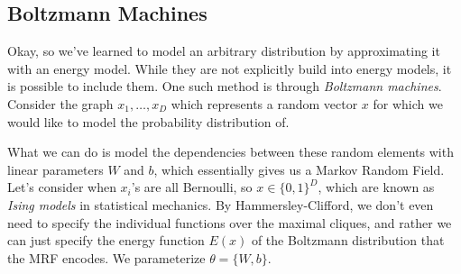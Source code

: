 \subsection{Boltzmann Machines}  

  Okay, so we've learned to model an arbitrary distribution by approximating it with an energy model. While they are not explicitly build into energy models, it is possible to include them. One such method is through \textit{Boltzmann machines}. Consider the graph $x_1, \ldots, x_D$ which represents a random vector $x$ for which we would like to model the probability distribution of. 
  \begin{center}
  \end{center}
  What we can do is model the dependencies between these random elements with linear parameters $W$ and $b$, which essentially gives us a Markov Random Field. Let's consider when $x_i$'s are all Bernoulli, so $x \in \{0, 1\}^D$, which are known as \textit{Ising models} in statistical mechanics. By Hammersley-Clifford, we don't even need to specify the individual functions over the maximal cliques, and rather we can just specify the energy function $E(x)$ of the Boltzmann distribution that the MRF encodes. We parameterize $\theta = \{W, b\}$. 

